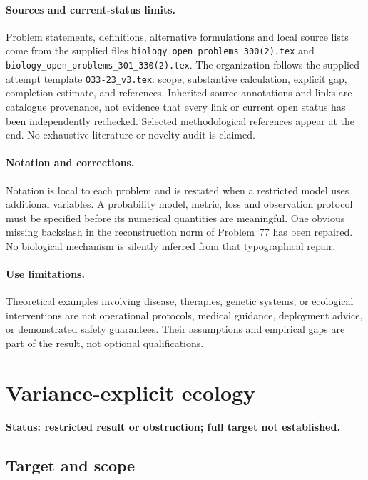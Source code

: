 \documentclass[11pt]{article}
\begin{document}
\paragraph{Sources and current-status limits.}
Problem statements, definitions, alternative formulations and local source lists
come from the supplied files
\texttt{biology\_open\_problems\_300(2).tex} and
\texttt{biology\_open\_problems\_301\_330(2).tex}.
The organization follows the supplied attempt template
\texttt{O33-23\_v3.tex}: scope, substantive calculation, explicit gap,
completion estimate, and references. Inherited source annotations and links are
catalogue provenance, not evidence that every link or current open status has
been independently rechecked. Selected methodological references appear at the
end. No exhaustive literature or novelty audit is claimed.

\paragraph{Notation and corrections.}
Notation is local to each problem and is restated when a restricted model uses
additional variables. A probability model, metric, loss and observation protocol
must be specified before its numerical quantities are meaningful. One obvious
missing backslash in the reconstruction norm of Problem~77 has been repaired.
No biological mechanism is silently inferred from that typographical repair.

\paragraph{Use limitations.}
Theoretical examples involving disease, therapies, genetic systems, or ecological
interventions are not operational protocols, medical guidance, deployment advice,
or demonstrated safety guarantees. Their assumptions and empirical gaps are part
of the result, not optional qualifications.


\section*{Variance-explicit ecology}
\label{prob:183}
\noindent\textbf{Status: restricted result or obstruction; full target not established.}
\subsection{Target and scope}
\end{document}
